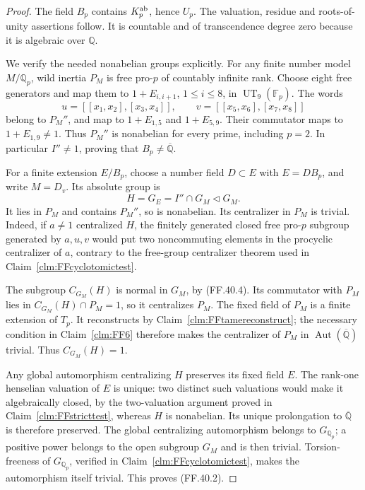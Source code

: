 \begin{proof}
The field \(B_p\) contains
\(K_p^{\rm ab}\), hence \(U_p\).
The valuation, residue and roots-of-unity
assertions follow. It is countable and
of transcendence degree zero because
it is algebraic over \(\mathbb Q\).

We verify the needed nonabelian groups
explicitly. For any finite number model
\(M/\mathbb Q_p\), wild inertia
\(P_M\) is free pro-\(p\) of
countably infinite rank. Choose eight
free generators and map them to
\(1+E_{i,i+1}\), \(1\le i\le8\),
in \(\operatorname{UT}_9(\mathbb F_p)\).
The words
\[
 u=[[x_1,x_2],[x_3,x_4]],\qquad
 v=[[x_5,x_6],[x_7,x_8]]
\]
belong to \(P_M''\), and map to
\(1+E_{1,5}\) and \(1+E_{5,9}\).
Their commutator maps to
\(1+E_{1,9}\ne1\). Thus
\(P_M''\) is nonabelian for every
prime, including \(p=2\).
In particular \(I''\ne1\), proving
that \(B_p\ne\overline{\mathbb Q}\).

For a finite extension \(E/B_p\),
choose a number field \(D\subset E\)
with \(E=DB_p\), and write
\(M=D_v\). Its absolute group is
\[
                 H=G_E=I''\cap G_M
                             \triangleleft G_M.
                                                        \tag{FF.40.4}
\]
It lies in \(P_M\) and contains
\(P_M''\), so is nonabelian.
Its centralizer in \(P_M\) is
trivial. Indeed, if \(a\ne1\)
centralized \(H\), the finitely
generated closed free pro-\(p\)
subgroup generated by \(a,u,v\)
would put two noncommuting elements
in the procyclic centralizer of
\(a\), contrary to the free-group
centralizer theorem used in
Claim~\ref{clm:FFcyclotomictest}.

The subgroup \(C_{G_M}(H)\) is
normal in \(G_M\), by (FF.40.4).
Its commutator with \(P_M\) lies
in \(C_{G_M}(H)\cap P_M=1\),
so it centralizes \(P_M\).
The fixed field of \(P_M\) is
a finite extension of \(T_p\).
It reconstructs by
Claim~\ref{clm:FFtamereconstruct};
the necessary condition in
Claim~\ref{clm:FF6} therefore makes
the centralizer of \(P_M\) in
\(\operatorname{Aut}(\overline{\mathbb Q})\)
trivial. Thus \(C_{G_M}(H)=1\).

Any global automorphism centralizing
\(H\) preserves its fixed field
\(E\). The rank-one henselian
valuation of \(E\) is unique:
two distinct such valuations would
make it algebraically closed, by
the two-valuation argument proved
in Claim~\ref{clm:FFstricttest},
whereas \(H\) is nonabelian.
Its unique prolongation to
\(\overline{\mathbb Q}\) is
therefore preserved. The global
centralizing automorphism belongs
to \(G_{\mathbb Q_p}\); a positive
power belongs to the open subgroup
\(G_M\) and is then trivial.
Torsion-freeness of \(G_{\mathbb Q_p}\),
verified in Claim~\ref{clm:FFcyclotomictest},
makes the automorphism itself
trivial. This proves (FF.40.2).


\end{proof}
